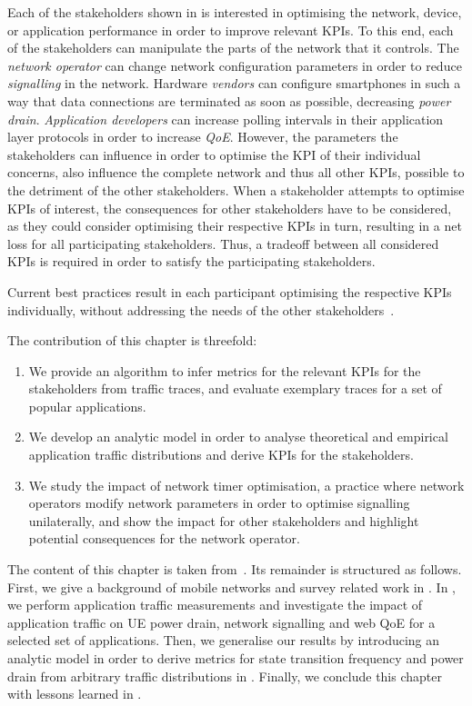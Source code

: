 Each of the stakeholders shown in  is interested in optimising the network, device, or application performance in order to improve relevant \glspl{KPI}.
To this end, each of the stakeholders can manipulate the parts of the network that it controls.
The \emph{network operator} can change network configuration parameters in order to reduce \emph{signalling} in the network.
Hardware \emph{vendors} can configure smartphones in such a way that data connections are terminated as soon as possible, decreasing \emph{power drain}.
\emph{Application developers} can increase polling intervals in their application layer protocols in order to increase \emph{\gls{QoE}}.
However, the parameters the stakeholders can influence in order to optimise the \gls{KPI} of their individual concerns, also influence the complete network and thus all other \glspl{KPI}, possible to the detriment of the other stakeholders.
When a stakeholder attempts to optimise \glspl{KPI} of interest, the consequences for other stakeholders have to be considered, as they could consider optimising their respective \glspl{KPI} in turn, resulting in a net loss for all participating stakeholders.
Thus, a tradeoff between all considered \glspl{KPI} is required in order to satisfy the participating stakeholders.

Current best practices result in each participant optimising the respective \glspl{KPI} individually, without addressing the needs of the other stakeholders~\cite{Qian2011a,NSN2011}.

The contribution of this chapter is threefold:
\begin{enumerate}
\item We provide an algorithm to infer metrics for the relevant \glspl{KPI} for the stakeholders from traffic traces, and evaluate exemplary traces for a set of popular applications.
\item We develop an analytic model in order to analyse theoretical and empirical application traffic distributions and derive \glspl{KPI} for the stakeholders.
\item We study the impact of network timer optimisation, a practice where network operators modify network parameters in order to optimise signalling unilaterally, and show the impact for other stakeholders and highlight potential consequences for the network operator.
\end{enumerate}

The content of this chapter is taken from~\cite{Schwartz2013a,Schwartz2013c}.
Its remainder is structured as follows.
First, we give a background of mobile networks and survey related work in .
In , we perform application traffic measurements and investigate the impact of application traffic on \gls{UE} power drain, network signalling and web \gls{QoE} for a selected set of applications.
Then, we generalise our results by introducing an analytic model in order to derive metrics for state transition frequency and power drain from arbitrary traffic distributions in .
Finally, we conclude this chapter with lessons learned in .






